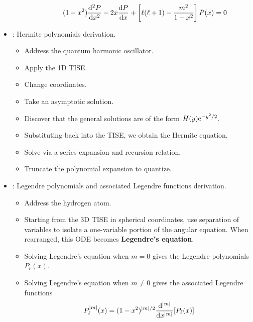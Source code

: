 \documentclass[../finalProject.tex]{subfiles}
\begin{document}
\begin{itemize}
\begin{itemize}
\begin{itemize}
            \begin{equation*}
                (1-x^2)\dv[2]{P}{x}-2x\dv{P}{x}+\left[ \ell(\ell+1)-\frac{m^2}{1-x^2} \right]P(x) = 0
            \end{equation*}
        \end{itemize}
    \end{itemize}
    \item \textcite[28-31]{bib:CHEM26100Notes}: Hermite polynomials derivation.
    \begin{itemize}
        \item Address the quantum harmonic oscillator.
        \item Apply the 1D TISE.
        \item Change coordinates.
        \item Take an asymptotic solution.
        \item Discover that the general solutions are of the form $H(y)\e[-y^2/2]$.
        \item Substituting back into the TISE, we obtain the Hermite equation.
        \item Solve via a series expansion and recursion relation.
        \item Truncate the polynomial expansion to quantize.
    \end{itemize}
    \item \textcite[56-65]{bib:CHEM26100Notes}: Legendre polynomials and associated Legendre functions derivation.
    \begin{itemize}
        \item Address the hydrogen atom.
        \item Starting from the 3D TISE in spherical coordinates, use separation of variables to isolate a one-variable portion of the angular equation. When rearranged, this ODE becomes \textbf{Legendre's equation}.
        \item Solving Legendre's equation when $m=0$ gives the Legendre polynomials $P_\ell(x)$.
        \item Solving Legendre's equation when $m\neq 0$ gives the associated Legendre functions
        \begin{equation*}
            P_\ell^{|m|}(x) = (1-x^2)^{|m|/2}\dv[|m|]{x}[P_\ell(x)]
        \end{equation*}
    \end{itemize}
\end{itemize}
\end{document}

